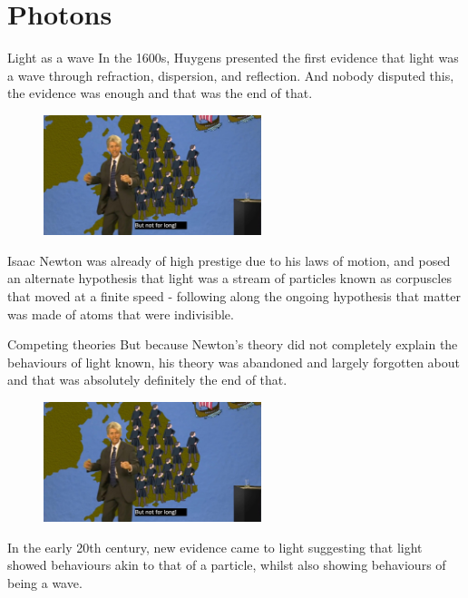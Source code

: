 \documentclass[../Main.tex]{subfiles}
\begin{document}
\author{Photons} %
\date{Year 1 Topic 20} %

\section{Photons} %

\begin{frame}{Light as a wave}
     In the 1600s, Huygens presented the first evidence that light was a wave through refraction, dispersion, and reflection. And nobody disputed this, the evidence was enough and that was the end of that. 
     \pause
     \begin{figure}
         \centering
         \includegraphics[height=3.5cm]{Quantum_Images/butnotforlong.jpg}
     \end{figure}
     Isaac Newton was already of high prestige due to his laws of motion, and posed an alternate hypothesis that light was a stream of particles known as corpuscles that moved at a finite speed - following along the ongoing hypothesis that matter was made of atoms that were indivisible.
\end{frame}

\begin{frame}{Competing theories}
    But because Newton's theory did not completely explain the behaviours of light known, his theory was abandoned and largely forgotten about and that was absolutely definitely the end of that.
    \pause
    \begin{figure}
        \centering
        \includegraphics[height=3.5cm]{Quantum_Images/butnotforlong.jpg}
    \end{figure}
    In the early 20th century, new evidence came to light suggesting that light showed behaviours akin to that of a particle, whilst also showing behaviours of being a wave.
\end{frame}
\end{document}
